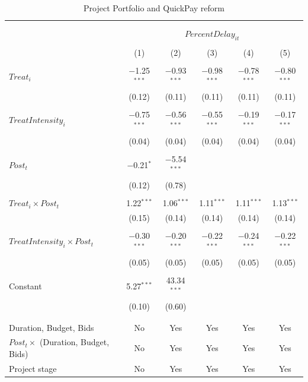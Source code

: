 \documentclass[
]{article}
\begin{document}
\begin{table}[H] \centering 
  \caption{Project Portfolio and QuickPay reform} 
  \label{} 
\small 
\begin{tabular}{@{\extracolsep{-2pt}}lccccc} 
\\[-1.8ex]\hline 
\hline \\[-1.8ex] 
\\[-1.8ex] & \multicolumn{5}{c}{$PercentDelay_{it}$  } \\ 
\\[-1.8ex] & (1) & (2) & (3) & (4) & (5)\\ 
\hline \\[-1.8ex] 
 $Treat_i$ & $-$1.25$^{***}$ & $-$0.93$^{***}$ & $-$0.98$^{***}$ & $-$0.78$^{***}$ & $-$0.80$^{***}$ \\ 
  & (0.12) & (0.11) & (0.11) & (0.11) & (0.11) \\ 
  & & & & & \\ 
 $TreatIntensity_i$ & $-$0.75$^{***}$ & $-$0.56$^{***}$ & $-$0.55$^{***}$ & $-$0.19$^{***}$ & $-$0.17$^{***}$ \\ 
  & (0.04) & (0.04) & (0.04) & (0.04) & (0.04) \\ 
  & & & & & \\ 
 $Post_t$ & $-$0.21$^{*}$ & $-$5.54$^{***}$ &  &  &  \\ 
  & (0.12) & (0.78) &  &  &  \\ 
  & & & & & \\ 
 $Treat_i \times Post_t$ & 1.22$^{***}$ & 1.06$^{***}$ & 1.11$^{***}$ & 1.11$^{***}$ & 1.13$^{***}$ \\ 
  & (0.15) & (0.14) & (0.14) & (0.14) & (0.14) \\ 
  & & & & & \\ 
 $TreatIntensity_i \times Post_t$ & $-$0.30$^{***}$ & $-$0.20$^{***}$ & $-$0.22$^{***}$ & $-$0.24$^{***}$ & $-$0.22$^{***}$ \\ 
  & (0.05) & (0.05) & (0.05) & (0.05) & (0.05) \\ 
  & & & & & \\ 
 Constant & 5.27$^{***}$ & 43.34$^{***}$ &  &  &  \\ 
  & (0.10) & (0.60) &  &  &  \\ 
  & & & & & \\ 
\hline \\[-1.8ex] 
Duration, Budget, Bids & No & Yes & Yes & Yes & Yes \\ 
$Post_t \times $  (Duration, Budget, Bids) & No & Yes & Yes & Yes & Yes \\ 
Project stage & No & Yes & Yes & Yes & Yes \\ 

\end{tabular}
\end{table}
\end{document}
